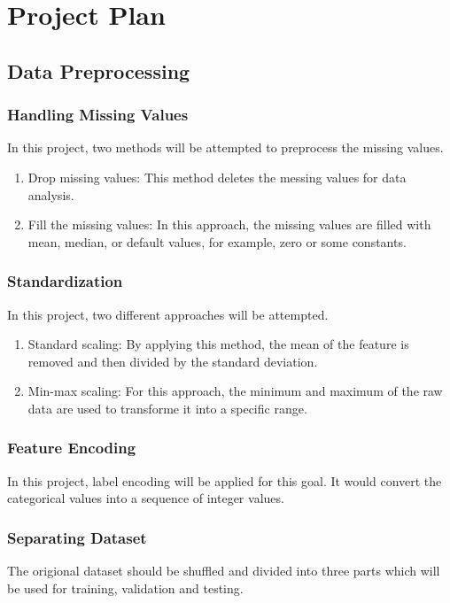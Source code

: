 \documentclass[12pt,twoside]{report}
\begin{document}
\chapter{Project Plan}

\section{Data Preprocessing}
\subsection{Handling Missing Values}
In this project, two methods will be attempted to preprocess the missing values.
\begin{enumerate}
	\item Drop missing values: This method deletes the messing values for data analysis.
	\item Fill the missing values: In this approach, the missing values are filled with mean, median, or default values, for example, zero or some constants.
\end{enumerate}

\subsection{Standardization}
In this project, two different approaches will be attempted. 
\begin{enumerate}
	\item Standard scaling: By applying this method, the mean of the feature is removed and then divided by the standard deviation. 
	\item Min-max scaling: For this approach, the minimum and maximum of the raw data are used to transforme it into a specific range.
\end{enumerate}

\subsection{Feature Encoding}
In this project, label encoding will be applied for this goal. It would convert the categorical values into a sequence of integer values. 

\subsection{Separating Dataset}
The origional dataset should be shuffled and divided into three parts which will be used for training, validation and testing. 
\end{document}
